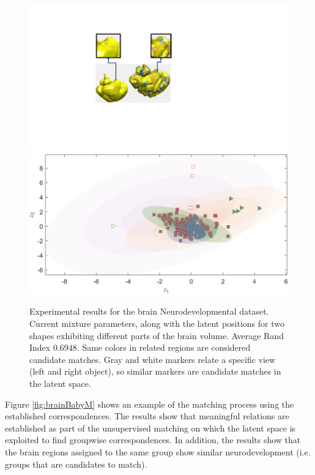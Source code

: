 \documentclass[]{article}
\begin{document}
\begin{figure}[ht!]
	\centering
	
	\includegraphics[width=0.45\linewidth]{img/brainBabyZ}
	\includegraphics[width=0.4\linewidth]{img/babyMVMMexp3v}
	\caption{Experimental results for the brain Neurodevelopmental dataset.  Current mixture parameters, along with the latent positions for two shapes exhibiting different parts of the brain volume. Average Rand Index $0.6948$. Same colors in related regions are considered candidate matches. Gray and white markers relate a specific view (left and right object), so similar markers are candidate matches in the latent space. }
	\label{fig:brainBaby}
\end{figure}

Figure \ref{fig:brainBabyM} shows an example of the matching process using the established correspondences. The results show that meaningful relations are established as part of the unsupervised matching on which the latent space is exploited to find groupwise correspondences. In addition, the results show that the brain regions assigned to the same group show similar neurodevelopment (i.e. groups that are candidates to match).
\end{document}
